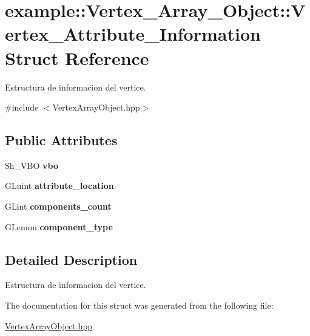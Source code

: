 \hypertarget{structexample_1_1_vertex___array___object_1_1_vertex___attribute___information}{}\section{example\+::Vertex\+\_\+\+Array\+\_\+\+Object\+::Vertex\+\_\+\+Attribute\+\_\+\+Information Struct Reference}
\label{structexample_1_1_vertex___array___object_1_1_vertex___attribute___information}


Estructura de informacion del vertice.  




{\ttfamily \#include $<$Vertex\+Array\+Object.\+hpp$>$}

\subsection*{Public Attributes}
\begin{DoxyCompactItemize}
\item 
\mbox{\label{structexample_1_1_vertex___array___object_1_1_vertex___attribute___information_a479f36f28c85453acd5f996f22b7a283}} 
Sh\+\_\+\+V\+BO {\bfseries vbo}
\item 
\mbox{\label{structexample_1_1_vertex___array___object_1_1_vertex___attribute___information_a7b6585192c2ccc399d60c54858d9f950}} 
G\+Luint {\bfseries attribute\+\_\+location}
\item 
\mbox{\label{structexample_1_1_vertex___array___object_1_1_vertex___attribute___information_aa1b831a89b856b2378ac67955f2cd8c4}} 
G\+Lint {\bfseries components\+\_\+count}
\item 
\mbox{\label{structexample_1_1_vertex___array___object_1_1_vertex___attribute___information_a1c756e0c8446109c83b9ba4d8eceb798}} 
G\+Lenum {\bfseries component\+\_\+type}
\end{DoxyCompactItemize}


\subsection{Detailed Description}
Estructura de informacion del vertice. 



The documentation for this struct was generated from the following file\+:\begin{DoxyCompactItemize}
\item 
\mbox{\hyperlink{_vertex_array_object_8hpp}{Vertex\+Array\+Object.\+hpp}}\end{DoxyCompactItemize}
